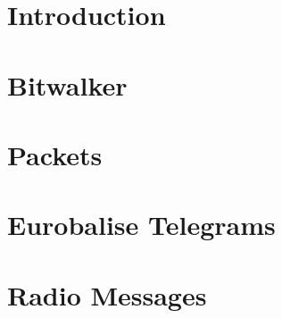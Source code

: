 \documentclass[paper=a4,12pt,DIV16,BCOR8mm,twoside]{scrreprt}
\begin{document}

%
%
%

\tableofcontents

\chapter{Introduction}
\chapter{Bitwalker}
\chapter{Packets}
\chapter{Eurobalise Telegrams}
\chapter{Radio Messages}

\cleardoublepage

%
 

%
%
\end{document}
